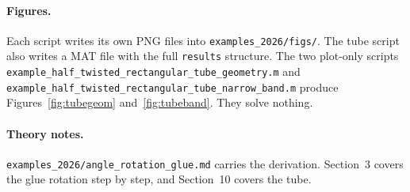 \paragraph{Figures.} Each script writes its own PNG files into
\texttt{examples\_2026/figs/}. The tube script also writes a MAT file
with the full \texttt{results} structure. The two plot-only scripts
\texttt{example\_half\_twisted\_rectangular\_tube\_geometry.m} and
\texttt{example\_half\_twisted\_rectangular\_tube\_narrow\_band.m}
produce Figures~\ref{fig:tubegeom} and~\ref{fig:tubeband}. They solve
nothing.

\paragraph{Theory notes.} \texttt{examples\_2026/angle\_rotation\_glue.md}
carries the derivation. Section~3 covers the glue rotation step by step,
and Section~10 covers the tube.
